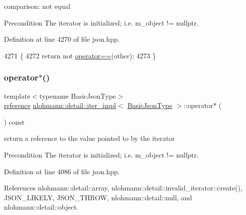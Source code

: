 comparison\+: not equal 

\begin{DoxyPrecond}{Precondition}
The iterator is initialized; i.\+e. {\ttfamily m\+\_\+object != nullptr}. 
\end{DoxyPrecond}


Definition at line 4270 of file json.\+hpp.


\begin{DoxyCode}
4271     \{
4272         \textcolor{keywordflow}{return} not \hyperlink{classnlohmann_1_1detail_1_1iter__impl_a2b592605b63ae7f5401996ffa3b14393}{operator==}(other);
4273     \}
\end{DoxyCode}
\mbox{\label{classnlohmann_1_1detail_1_1iter__impl_a5ca57856d9bba54a5fc51cee891de827}} 
\subsubsection{\texorpdfstring{operator$\ast$()}{operator*()}}
{\footnotesize\ttfamily template$<$typename Basic\+Json\+Type$>$ \\
\hyperlink{classnlohmann_1_1detail_1_1iter__impl_a5be8001be099c6b82310f4d387b953ce}{reference} \hyperlink{classnlohmann_1_1detail_1_1iter__impl}{nlohmann\+::detail\+::iter\+\_\+impl}$<$ \hyperlink{classnlohmann_1_1detail_1_1iter__impl_abf18f18793f84b0222aebb5a2a87da7a}{Basic\+Json\+Type} $>$\+::operator$\ast$ (\begin{DoxyParamCaption}{ }\end{DoxyParamCaption}) const\hspace{0.3cm}{\ttfamily [inline]}}



return a reference to the value pointed to by the iterator 

\begin{DoxyPrecond}{Precondition}
The iterator is initialized; i.\+e. {\ttfamily m\+\_\+object != nullptr}. 
\end{DoxyPrecond}


Definition at line 4086 of file json.\+hpp.



References nlohmann\+::detail\+::array, nlohmann\+::detail\+::invalid\+\_\+iterator\+::create(), J\+S\+O\+N\+\_\+\+L\+I\+K\+E\+LY, J\+S\+O\+N\+\_\+\+T\+H\+R\+OW, nlohmann\+::detail\+::null, and nlohmann\+::detail\+::object.


